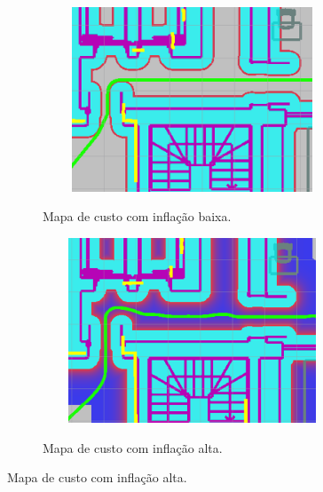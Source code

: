 \documentclass[repeatfields,xlists,xpacks,oneside,yearsonly]{ufrgscca}
\begin{document}
\begin{figure}[h]
    \caption{Trajetórias criadas com diferentes configurações da camada de inflação}
    \begin{subfigure}{0.5\linewidth}
    {
        \centering
        \caption{Mapa de custo com inflação baixa.}
        \label{fig:inflation_low}
        \includegraphics[width=0.98\textwidth, height=5.5cm]{costmap_not_inflated.png}\\
    }
    \end{subfigure}
    \begin{subfigure}{0.5\linewidth}
    {
        \centering
        \caption{Mapa de custo com inflação alta.}
        \label{fig:inflation_high}
        \includegraphics[width=0.98\textwidth, height=5.5cm]{costmap_inflated.png}\\
    }
    \end{subfigure}
\end{figure}
\end{document}
